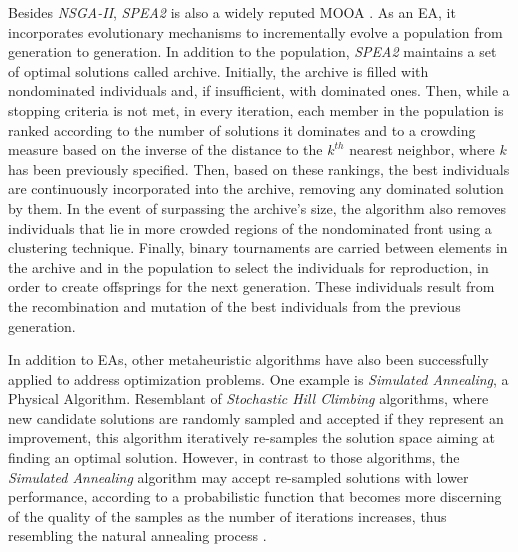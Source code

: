 	Besides \textit{\ac{NSGA-II}}, \textit{\ac{SPEA2}} is also a widely reputed \ac{MOOA} \cite{Zitzler2001SPEA2}. As an \ac{EA}, it incorporates evolutionary mechanisms to incrementally evolve a population from generation to generation. In addition to the population, \textit{\ac{SPEA2}} maintains a set of optimal solutions called archive. Initially, the archive is filled with nondominated individuals and, if insufficient, with dominated ones. Then, while a stopping criteria is not met, in every iteration, each member in the population is ranked according to the number of solutions it dominates and to a crowding measure based on the inverse of the distance to the $k^{th}$ nearest neighbor, where $k$ has been previously specified. 
	Then, based on these rankings, the best individuals are continuously incorporated into the archive, removing any dominated solution by them. In the event of surpassing the archive's size, the algorithm also removes individuals that lie in more crowded regions of the nondominated front using a clustering technique. Finally, binary tournaments are carried between elements in the archive and in the population to select the individuals for reproduction, in order to create offsprings for the next generation. These individuals result from the recombination and mutation of the best individuals from the previous generation. 
		
	In addition to \acp{EA}, other metaheuristic algorithms have also been successfully applied to address optimization problems. One example is \textit{Simulated Annealing}, a Physical Algorithm. Resemblant of \textit{Stochastic Hill Climbing} algorithms, where new candidate solutions are randomly sampled and accepted if they represent an improvement, this algorithm iteratively re-samples the solution space aiming at finding an optimal solution. However, in contrast to those algorithms, the \textit{Simulated Annealing} algorithm may accept re-sampled solutions with lower performance, according to a probabilistic function that becomes more discerning of the quality of the samples as the number of iterations increases, thus resembling the natural annealing process \cite{Brownlee2011}. 
	

